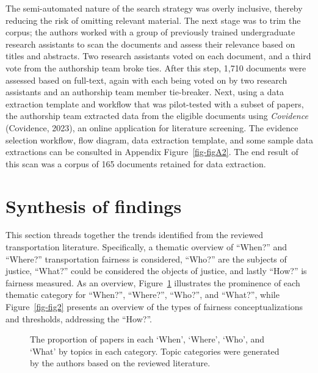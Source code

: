 \documentclass[
  letterpaper,
  DIV=11,
  numbers=noendperiod]{scrartcl}
\begin{document}
The semi-automated nature of the search strategy was overly inclusive,
thereby reducing the risk of omitting relevant material. The next stage
was to trim the corpus; the authors worked with a group of previously
trained undergraduate research assistants to scan the documents and
assess their relevance based on titles and abstracts. Two research
assistants voted on each document, and a third vote from the authorship
team broke ties. After this step, 1,710 documents were assessed based on
full-text, again with each being voted on by two research assistants and
an authorship team member tie-breaker. Next, using a data extraction
template and workflow that was pilot-tested with a subset of papers, the
authorship team extracted data from the eligible documents using
\emph{Covidence} (Covidence, 2023), an online application for literature
screening. The evidence selection workflow, flow diagram, data
extraction template, and some sample data extractions can be consulted
in Appendix Figure~\ref{fig-figA2}. The end result of this scan was a
corpus of 165 documents retained for data extraction.

\section{Synthesis of findings}\label{synthesis-of-findings}

This section threads together the trends identified from the reviewed
transportation literature. Specifically, a thematic overview of
``When?'' and ``Where?'' transportation fairness is considered, ``Who?''
are the subjects of justice, ``What?'' could be considered the objects
of justice, and lastly ``How?'' is fairness measured. As an overview,
Figure~\ref{fig-fig1} illustrates the prominence of each thematic
category for ``When?'', ``Where?'', ``Who?'', and ``What?'', while
Figure~\ref{fig-fig2} presents an overview of the types of fairness
conceptualizations and thresholds, addressing the ``How?''.

\begin{figure}


\caption{\label{fig-fig1}The proportion of papers in each `When',
`Where', `Who', and `What' by topics in each category. Topic categories
were generated by the authors based on the reviewed literature.}

\end{figure}%
\end{document}
